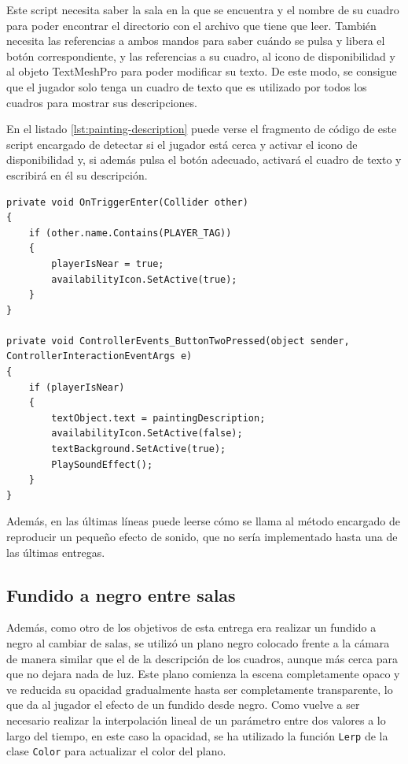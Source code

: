 Este script necesita saber la sala en la que se encuentra y el nombre de su cuadro para poder encontrar el directorio con el archivo que tiene que leer. También necesita las referencias a ambos mandos para saber cuándo se pulsa y libera el botón correspondiente, y las referencias a su cuadro, al icono de disponibilidad y al objeto TextMeshPro para poder modificar su texto. De este modo, se consigue que el jugador solo tenga un cuadro de texto que es utilizado por todos los cuadros para mostrar sus descripciones.

En el listado \ref{lst:painting-description} puede verse el fragmento de código de este script encargado de detectar si el jugador está cerca y activar el icono de disponibilidad y, si además pulsa el botón adecuado, activará el cuadro de texto y escribirá en él su descripción.

\begin{lstlisting}[caption=Fragmento del script para activar la descripción de los cuadros, label=lst:painting-description]
private void OnTriggerEnter(Collider other)
{
    if (other.name.Contains(PLAYER_TAG))
    {
        playerIsNear = true;
        availabilityIcon.SetActive(true);
    }
}
    
private void ControllerEvents_ButtonTwoPressed(object sender, ControllerInteractionEventArgs e)
{
    if (playerIsNear)
    {
        textObject.text = paintingDescription;
        availabilityIcon.SetActive(false);
        textBackground.SetActive(true);
        PlaySoundEffect();
    }
}
\end{lstlisting}

Además, en las últimas líneas puede leerse cómo se llama al método encargado de reproducir un pequeño efecto de sonido, que no sería implementado hasta una de las últimas entregas.

\subsection{Fundido a negro entre salas}

Además, como otro de los objetivos de esta entrega era realizar un fundido a negro al cambiar de salas, se utilizó un plano negro colocado frente a la cámara de manera similar que el de la descripción de los cuadros, aunque más cerca para que no dejara nada de luz. Este plano comienza la escena completamente opaco y ve reducida su opacidad gradualmente hasta ser completamente transparente, lo que da al jugador el efecto de un fundido desde negro. Como vuelve a ser necesario realizar la interpolación lineal de un parámetro entre dos valores a lo largo del tiempo, en este caso la opacidad, se ha utilizado la función \texttt{Lerp} de la clase \texttt{Color} para actualizar el color del plano.

